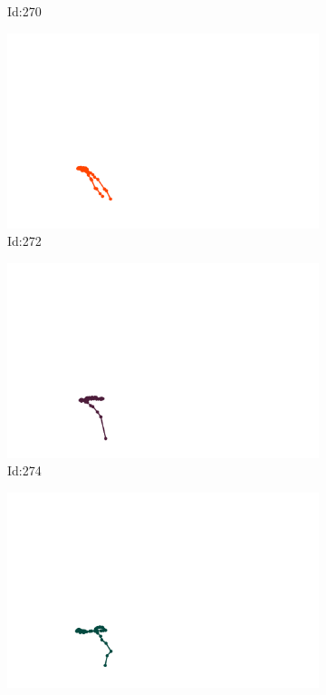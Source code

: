 \documentclass[12pt,twoside]{report}
\begin{document}
\begin{figure}
\begin{subfigure}[b]{0.20\textwidth}
\caption{Id:270}
\end{subfigure}
\begin{subfigure}[b]{0.20\textwidth}
\centering
\includegraphics[width=\textwidth]{../../trajectories/272.png}
\caption{Id:272}
\end{subfigure}
\begin{subfigure}[b]{0.20\textwidth}
\centering
\includegraphics[width=\textwidth]{../../trajectories/274.png}
\caption{Id:274}
\end{subfigure}
\begin{subfigure}[b]{0.20\textwidth}
\centering
\includegraphics[width=\textwidth]{../../trajectories/276.png}

\end{subfigure}
\end{figure}
\end{document}
